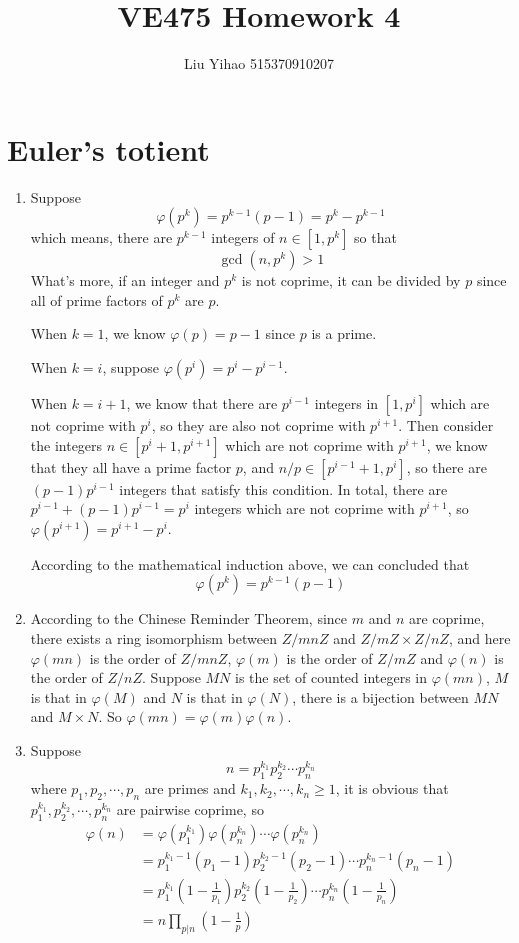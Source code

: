 \documentclass{article}
\title{VE475 Homework 4}
\author{Liu Yihao 515370910207}
\date{}
\begin{document}
\maketitle

\section{Euler's totient}
\begin{enumerate}
\item 
Suppose $$\varphi(p^k)=p^{k-1}(p-1)=p^k-p^{k-1}$$ which means, there are $p^{k-1}$ integers of $n\in[1,p^k]$ so that $$\gcd(n,p^k)>1$$
What's more, if an integer and $p^k$ is not coprime, it can be divided by $p$ since all of prime factors of $p^k$ are $p$.

When $k=1$, we know $\varphi(p)=p-1$ since $p$ is a prime.

When $k=i$, suppose $\varphi(p^i)=p^{i}-p^{i-1}$.

When $k=i+1$, we know that there are $p^{i-1}$ integers in $[1,p^i]$ which are not coprime with $p^i$, so they are also not coprime with $p^{i+1}$. Then consider the integers $n\in[p^i+1,p^{i+1}]$ which are not coprime with $p^{i+1}$, we know that they all have a prime factor $p$, and $n/p\in[p^{i-1}+1,p^i]$, so there are $(p-1)p^{i-1}$ integers that satisfy this condition. In total, there are $p^{i-1}+(p-1)p^{i-1}=p^{i}$ integers which are not coprime with $p^{i+1}$, so $\varphi(p^{i+1})=p^{i+1}-p^i$.

According to the mathematical induction above, we can concluded that $$\varphi(p^k)=p^{k-1}(p-1)$$

\item
According to the Chinese Reminder Theorem, since $m$ and $n$ are coprime, there exists a ring isomorphism between $Z/mnZ$ and $Z/mZ\times Z/nZ$, and here $\varphi(mn)$ is the order of $Z/mnZ$, $\varphi(m)$ is the order of $Z/mZ$ and $\varphi(n)$ is the order of $Z/nZ$. Suppose $MN$ is the set of counted integers in $\varphi(mn)$, $M$ is that in $\varphi(M)$ and $N$ is that in $\varphi(N)$, there is a bijection between $MN$ and $M\times N$. So $\varphi(mn)=\varphi(m)\varphi(n)$.

\item
Suppose $$n=p_1^{k_1}p_2^{k_2}\cdots p_n^{k_n}$$ where $p_1,p_2,\cdots,p_n$ are primes and $k_1,k_2,\cdots,k_n\geqslant1$, it is obvious that $p_1^{k_1},p_2^{k_2},\cdots,p_n^{k_n}$ are pairwise coprime, so 
\begin{align*}
\varphi(n)&=\varphi(p_1^{k_1})\varphi(p_n^{k_n})\cdots\varphi(p_n^{k_n})\\
&=p_1^{k_1-1}(p_1-1)p_2^{k_2-1}(p_2-1)\cdots p_n^{k_n-1}(p_n-1)\\
&=p_1^{k_1}\left(1-\frac{1}{p_1}\right)p_2^{k_2}\left(1-\frac{1}{p_2}\right)\cdots p_n^{k_n}\left(1-\frac{1}{p_n}\right)\\
&=n\prod_{p|n}\left(1-\frac{1}{p}\right)
\end{align*}


\end{enumerate}
\end{document}
